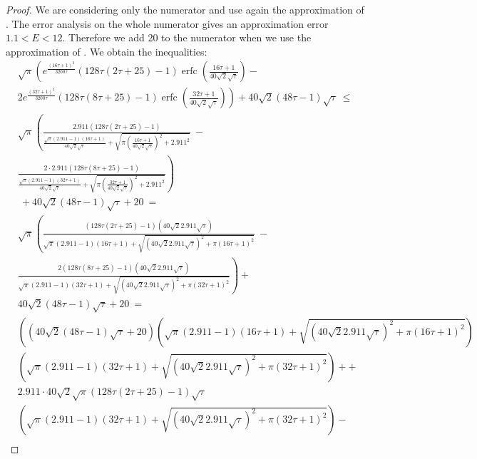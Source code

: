 \documentclass{article}
\renewcommand{\leq}{\leqslant}
\DeclareMathOperator{\erfc}{erfc}
\begin{document}
\begin{proof}
We are considering only the numerator and use again the approximation
of \citet{Ren:07}.
The error analysis on the whole numerator gives an approximation error $1.1<E<12$. Therefore
we add 20 to the numerator when we use the approximation of \citet{Ren:07}.
We obtain the inequalities:
\begin{align}
&\sqrt{\pi } \left(e^{\frac{(16 \tau+1)^2}{3200 \tau}} (128 \tau (2  \tau+25)-1) \erfc \left(\frac{16 \tau+1}{40 \sqrt{2} \sqrt{\tau}}\right)-\right.\\\nonumber 
&\left.2 e^{\frac{(32  \tau+1)^2}{3200 \tau}} (128 \tau (8 \tau+25)-1) \erfc \left(\frac{32  \tau+1}{40 \sqrt{2} \sqrt{\tau}}\right)\right)+40 \sqrt{2} (48 \tau-1) \sqrt{\tau}\ \leq \\ \nonumber 
& \sqrt{\pi } \left(\frac{2.911 (128 \tau (2  \tau+25)-1)}{\frac{\sqrt{\pi } (2.911 -1) (16 \tau+1)}{40 \sqrt{2} \sqrt{\tau}}+\sqrt{\pi  \left(\frac{16 \tau+1}{40 \sqrt{2} \sqrt{\tau}}\right)^2+2.911^2}} \ -\right.\\\nonumber 
&\left.\frac{2 \cdot 2.911 (128 \tau (8 \tau+25)-1)}{\frac{\sqrt{\pi } (2.911 -1) (32  \tau+1)}{40 \sqrt{2} \sqrt{\tau}}+\sqrt{\pi  \left(\frac{32  \tau+1}{40 \sqrt{2} \sqrt{\tau}}\right)^2+2.911^2}}\right)\\ \nonumber 
&\ +40 \sqrt{2} (48 \tau-1) \sqrt{\tau}+20\ = \\ \nonumber 
&\sqrt{\pi } \left(\frac{(128 \tau (2  \tau+25)-1) \left(40 \sqrt{2} 2.911 \sqrt{\tau}\right)}{\sqrt{\pi } (2.911 -1) (16 \tau+1)+\sqrt{\left(40 \sqrt{2} 2.911 \sqrt{\tau}\right)^2+\pi  (16 \tau+1)^2}} \ -\right.\\\nonumber
&\left.\frac{2 (128 \tau (8 \tau+25)-1) \left(40 \sqrt{2} 2.911 \sqrt{\tau}\right)}{\sqrt{\pi } (2.911 -1) (32  \tau+1)+\sqrt{\left(40 \sqrt{2} 2.911 \sqrt{\tau}\right)^2+\pi  (32  \tau+1)^2}}\right)+\\ \nonumber 
&40 \sqrt{2} (48 \tau-1) \sqrt{\tau}+20\ = \\ \nonumber 
&\left(\left(40 \sqrt{2} (48 \tau-1) \sqrt{\tau}+20\right) \left(\sqrt{\pi } (2.911 -1) (16 \tau+1)+\sqrt{\left(40 \sqrt{2} 2.911 \sqrt{\tau}\right)^2+\pi  (16 \tau+1)^2}\right) \right.\\\nonumber 
&\left. \left(\sqrt{\pi } (2.911 -1) (32  \tau+1)+\sqrt{\left(40 \sqrt{2} 2.911 \sqrt{\tau}\right)^2+\pi  (32  \tau+1)^2}\right)++\right.\\\nonumber 
&\left.2.911 \cdot 40 \sqrt{2} \sqrt{\pi } (128 \tau (2  \tau+25)-1) \sqrt{\tau}  \right.\\\nonumber 
&\left.\left(\sqrt{\pi } (2.911 -1) (32  \tau+1)+\sqrt{\left(40 \sqrt{2} 2.911 \sqrt{\tau}\right)^2+\pi  (32  \tau+1)^2}\right)- \right.\\\nonumber 

\end{align}
\end{proof}
\end{document}
